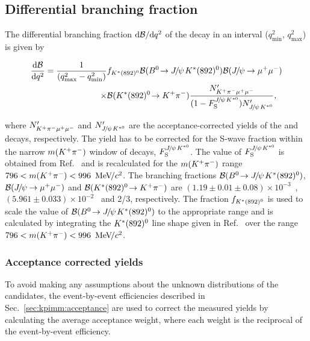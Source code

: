 \subsection{Differential branching fraction}
\label{sec:kpimm:bf}
 
The differential branching fraction $\mathrm{d}{\mathcal{B}}/\mathrm{d}{q^2}$ of the decay \BdToKpimm in an interval ($q^{2}_{\text{min}}$, $q^{2}_{\text{max}}$) is given by

\begin{equation}
\begin{split}
\frac{\deriv\BF}{\deriv\qsq} = \frac{1}{(q^{2}_{\text{max}} - q^{2}_{\text{min}}) }&f_{\KstP}\BF(\BdToJPsiKstP)\BF(\decay{\jpsi}{\mumu}) \\
\times&\BF(\decay{\KstP}{\Kp\pim})\frac{N'_{\kpimm}}{(1-F_{\rm S}^{\jpsi\Kstarz})N'_{\jpsi\Kstarz}},
\end{split}
\label{eqn:dbfdq2}
\end{equation}

\noindent where $N'_{{{K}^+}{{\pi}^-}{\mu^+}{\mu^-}}$ and $N'_{{{J\mskip -3mu/\mskip -2mu\psi\mskip 2mu}}{{K}^{*0}}}$ are the acceptance-corrected yields of the \BdToKpimm and \BdToJPsiKst decays, respectively. The \BdToJPsiKst yield has to be corrected for the S-wave fraction within the narrow $m({{K}^+}{{\pi}^-})$ window of \BdToJPsiKst decays, $F_{\rm S}^{{{J\mskip -3mu/\mskip -2mu\psi\mskip 2mu}}{{K}^{*0}}}$. The value of $F_{\rm S}^{{{J\mskip -3mu/\mskip -2mu\psi\mskip 2mu}}{{K}^{*0}}}$ is obtained from Ref.~\cite{LHCb-PAPER-2013-023} and is recalculated for the $m({{K}^+}{{\pi}^-})$ range $796<m({{K}^+}{{\pi}^-})<996~{\mathrm{\,Me\kern -0.1em V\!/}c^2}$. The branching fractions ${\mathcal{B}}({{B}^0}\!\rightarrow {\ensuremath{{J\mskip -3mu/\mskip -2mu\psi\mskip 2mu}}}{\ensuremath{K}}^{*}(892)^{0})$, ${\mathcal{B}}({{J\mskip -3mu/\mskip -2mu\psi\mskip 2mu}}\!\rightarrow {\ensuremath{\mu^+\mu^-}})$ and ${\mathcal{B}}({K}^{*}(892)^{0}\!\rightarrow {\ensuremath{{K}^+}}{\ensuremath{{\pi}^-}})$ are $(1.19\pm0.01\pm0.08)\times10^{-3}$~\cite{belle-z-paper}, $(5.961 \pm 0.033) \times 10^{-2}$~\cite{pdg} and 2/3, respectively. The fraction $f_{{K}^{*}(892)^{0}}$ is used to scale the value of ${\mathcal{B}}({{B}^0}\!\rightarrow {\ensuremath{{J\mskip -3mu/\mskip -2mu\psi\mskip 2mu}}}{\ensuremath{K}}^{*}(892)^{0})$ to the appropriate \mkpi range and is calculated by integrating the ${K}^{*}(892)^{0}$ line shape given in Ref.~\cite{belle-z-paper} over the range $796<m({{K}^+}{{\pi}^-})<996~{\mathrm{\,Me\kern -0.1em V\!/}c^2}$.
 
\subsubsection{Acceptance corrected yields}
 
To avoid making any assumptions about the unknown distributions of the \BdToKpimm candidates, the event-by-event efficiencies described in Sec.~\ref{sec:kpimm:acceptance} are used to correct the measured yields by calculating the average acceptance weight, where each weight is the reciprocal of the event-by-event efficiency.
 
